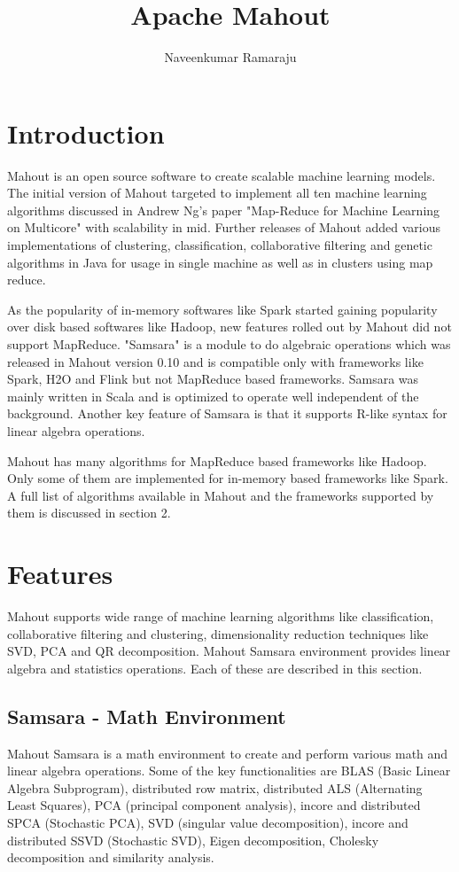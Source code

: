 \documentclass[9pt,twocolumn,twoside]{../../styles/osajnl}
\title{Apache Mahout}
\author[1,*]{Naveenkumar Ramaraju}
\affil[1]{School of Informatics and Computing, Bloomington, IN 47408, U.S.A.}
\affil[*]{Corresponding authors:naveenkumar2703@gmail.com}
\begin{document}
\maketitle

\section{Introduction}
Mahout is an open source software to create scalable machine learning
models. The initial version of Mahout targeted to implement all ten
machine learning algorithms discussed in Andrew Ng's paper "Map-Reduce
for Machine Learning on Multicore"\cite{paper-NIPS2006_3150} with
scalability in mid. Further releases of Mahout added various
implementations of clustering, classification, collaborative filtering
and genetic algorithms in Java for usage in single machine as well as
in clusters using map reduce.

As the popularity of in-memory softwares like Spark started gaining
popularity over disk based softwares like Hadoop, new features rolled
out by Mahout did not support MapReduce. "Samsara" is a module to do
algebraic operations which was released in Mahout version 0.10 and is
compatible only with frameworks like Spark\cite{www-Spark},
H2O\cite{www-H20} and Flink\cite{www-Flink} but not MapReduce based
frameworks. Samsara was mainly written in Scala and is optimized to
operate well independent of the background. Another key feature of
Samsara is that it supports R-like syntax for linear algebra
operations.

Mahout has many algorithms for MapReduce based frameworks like Hadoop.
Only some of them are implemented for in-memory based frameworks like
Spark. A full list of algorithms available in Mahout and the
frameworks supported by them is discussed in section 2.


\section{Features}
Mahout supports wide range of machine learning algorithms like
classification, collaborative filtering and clustering, dimensionality
reduction techniques like SVD, PCA and QR
decomposition\cite{www-mahoutFeatures}. Mahout Samsara environment
provides linear algebra and statistics operations. Each of these are
described in this section.

\subsection{Samsara - Math Environment}
Mahout Samsara\cite{www-samsara} is a math environment to create and
perform various math and linear algebra operations. Some of the key
functionalities are BLAS (Basic Linear Algebra Subprogram),
distributed row matrix, distributed ALS (Alternating Least Squares),
PCA (principal component analysis), incore and distributed SPCA
(Stochastic PCA), SVD (singular value decomposition), incore and
distributed SSVD (Stochastic SVD), Eigen decomposition, Cholesky
decomposition and similarity analysis.
\end{document}
